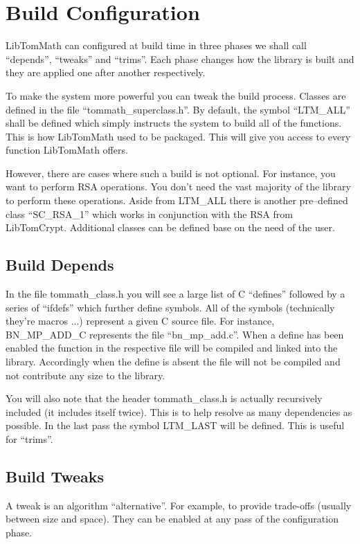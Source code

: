 \documentclass[synpaper]{book}
\begin{document}
\section{Build Configuration}
LibTomMath can configured at build time in three phases we shall call ``depends'', ``tweaks'' and ``trims''.
Each phase changes how the library is built and they are applied one after another respectively.

To make the system more powerful you can tweak the build process.  Classes are defined in the file
``tommath\_superclass.h''.  By default, the symbol ``LTM\_ALL'' shall be defined which simply
instructs the system to build all of the functions.  This is how LibTomMath used to be packaged.  This will give you
access to every function LibTomMath offers.

However, there are cases where such a build is not optional.  For instance, you want to perform RSA operations.  You
don't need the vast majority of the library to perform these operations.  Aside from LTM\_ALL there is
another pre--defined class ``SC\_RSA\_1'' which works in conjunction with the RSA from LibTomCrypt.  Additional
classes can be defined base on the need of the user.

\subsection{Build Depends}
In the file tommath\_class.h you will see a large list of C ``defines'' followed by a series of ``ifdefs''
which further define symbols.  All of the symbols (technically they're macros $\ldots$) represent a given C source
file.  For instance, BN\_MP\_ADD\_C represents the file ``bn\_mp\_add.c''.  When a define has been enabled the
function in the respective file will be compiled and linked into the library.  Accordingly when the define
is absent the file will not be compiled and not contribute any size to the library.

You will also note that the header tommath\_class.h is actually recursively included (it includes itself twice).
This is to help resolve as many dependencies as possible.  In the last pass the symbol LTM\_LAST will be defined.
This is useful for ``trims''.

\subsection{Build Tweaks}
A tweak is an algorithm ``alternative''.  For example, to provide trade-offs (usually between size and space).
They can be enabled at any pass of the configuration phase.
\end{document}
